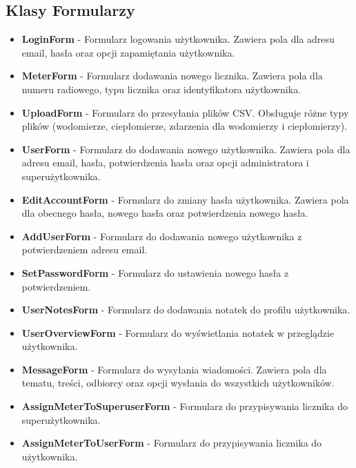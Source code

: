 \documentclass[12pt,a4paper]{report}
\begin{document}
\subsection{Klasy Formularzy}
\begin{itemize}
    \item \textbf{LoginForm} - Formularz logowania użytkownika. Zawiera pola dla adresu email, hasła oraz opcji zapamiętania użytkownika.

    \item \textbf{MeterForm} - Formularz dodawania nowego licznika. Zawiera pola dla numeru radiowego, typu licznika oraz identyfikatora użytkownika.

    \item \textbf{UploadForm} - Formularz do przesyłania plików CSV. Obsługuje różne typy plików (wodomierze, ciepłomierze, zdarzenia dla wodomierzy i ciepłomierzy).

    \item \textbf{UserForm} - Formularz do dodawania nowego użytkownika. Zawiera pola dla adresu email, hasła, potwierdzenia hasła oraz opcji administratora i superużytkownika.

    \item \textbf{EditAccountForm} - Formularz do zmiany hasła użytkownika. Zawiera pola dla obecnego hasła, nowego hasła oraz potwierdzenia nowego hasła.

    \item \textbf{AddUserForm} - Formularz do dodawania nowego użytkownika z potwierdzeniem adresu email.

    \item \textbf{SetPasswordForm} - Formularz do ustawienia nowego hasła z potwierdzeniem.

    \item \textbf{UserNotesForm} - Formularz do dodawania notatek do profilu użytkownika.

    \item \textbf{UserOverviewForm} - Formularz do wyświetlania notatek w przeglądzie użytkownika.

    \item \textbf{MessageForm} - Formularz do wysyłania wiadomości. Zawiera pola dla tematu, treści, odbiorcy oraz opcji wysłania do wszystkich użytkowników.

    \item \textbf{AssignMeterToSuperuserForm} - Formularz do przypisywania licznika do superużytkownika.

    \item \textbf{AssignMeterToUserForm} - Formularz do przypisywania licznika do użytkownika.
\end{itemize}
\end{document}
